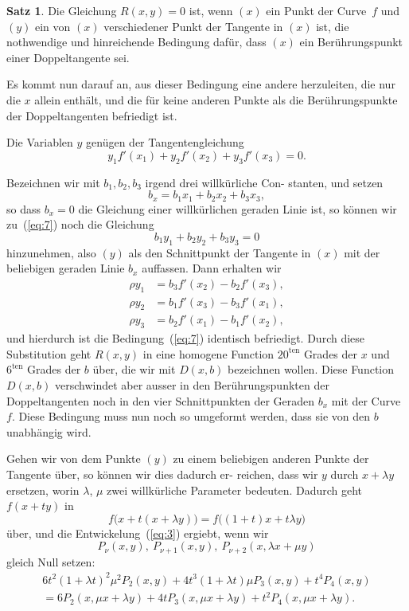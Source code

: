 \documentclass[12pt,a4paper]{article}
\theoremstyle{definition}
\newtheorem*{satz}{Satz}
\begin{document}
\begin{satz}
Die Gleichung $R(x,y) = 0$ ist, wenn $(x)$ ein Punkt
der Curve~$f$ und $(y)$ ein von $(x)$ verschiedener
Punkt der Tangente in $(x)$ ist, die nothwendige
und hinreichende Bedingung dafür, dass $(x)$ ein
Berührungspunkt einer Doppeltangente sei.
\end{satz}

Es kommt nun darauf an, aus dieser Bedingung eine andere
herzuleiten, die nur die $x$ allein enthält, und die für keine
anderen Punkte als die Berührungspunkte der Doppeltangenten
befriedigt ist.

Die Variablen $y$ genügen der Tangentengleichung
\begin{equation}\label{eq:7}
y_1 f'(x_1) + y_2 f'(x_2) + y_3 f'(x_3) = 0.
\end{equation}

Bezeichnen wir mit $b_1, b_2, b_3$ irgend drei willkürliche Con-
stanten, und setzen
\begin{equation}\label{eq:8}
b_x = b_1 x_1 + b_2 x_2 + b_3 x_3,
\end{equation}
so dass $b_x = 0$ die Gleichung einer willkürlichen geraden Linie
ist, so können wir zu~(\ref{eq:7}) noch die Gleichung
\begin{equation}\label{eq:9}
b_1 y_1 + b_2 y_2 + b_3 y_3 = 0
\end{equation}
hinzunehmen, also $(y)$ als den Schnittpunkt der Tangente in $(x)$
mit der beliebigen geraden Linie $b_x$ auffassen. Dann erhalten wir
\begin{equation}\label{eq:10}
\begin{aligned}
\rho y_1 &= b_3 f'(x_2) - b_2 f'(x_3),\\
\rho y_2 &= b_1 f'(x_3) - b_3 f'(x_1),\\
\rho y_3 &= b_2 f'(x_1) - b_1 f'(x_2),
\end{aligned}
\end{equation}
und hierdurch ist die Bedingung~(\ref{eq:7}) identisch befriedigt. Durch
diese Substitution geht $R(x,y)$ in eine homogene Function
$20^{\text{ten}}$ Grades der $x$ und $6^{\text{ten}}$ Grades der $b$ über, die wir mit
$D(x,b)$ bezeichnen wollen. Diese Function $D(x,b)$ verschwindet
aber ausser in den Berührungspunkten der Doppeltangenten noch
in den vier Schnittpunkten der Geraden $b_x$ mit der Curve~$f$.
Diese Bedingung muss nun noch so umgeformt werden, dass sie
von den $b$ unabhängig wird.

Gehen wir von dem Punkte $(y)$ zu einem beliebigen anderen
Punkte der Tangente über, so können wir dies dadurch er-
reichen, dass wir $y$ durch $x + \lambda y$ ersetzen, worin $\lambda$, $\mu$ zwei
willkürliche Parameter bedeuten. Dadurch geht $f(x + ty)$ in
\[f\bigl(x + t(x + \lambda y)\bigr) = f\bigl((1+t)x + t\lambda y\bigr)\]
über, und die Entwickelung~(\ref{eq:3}) ergiebt, wenn wir
\[P_\nu(x,y),\ P_{\nu+1}(x,y),\ P_{\nu+2}(x,\lambda x + \mu y)\]
gleich Null setzen:
\begin{multline*}
6t^2(1+\lambda t)^2 \mu^2 P_2(x,y) + 4t^3(1+\lambda t)\mu P_3(x,y) + t^4 P_4(x,y)\\
= 6P_2(x,\mu x + \lambda y) + 4tP_3(x,\mu x + \lambda y) + t^2 P_4(x,\mu x + \lambda y).
\end{multline*}
\end{document}

